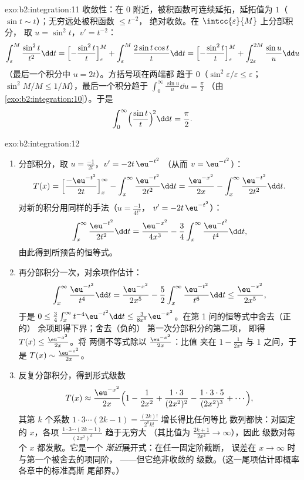 \begin{solution}{exo:b2:integration:11}
收敛性：在 $0$ 附近，被积函数可连续延拓，延拓值为
$1$（$\sin t \sim t$）；无穷远处被积函数 $\leq t^{-2}$，
绝对收敛。在 $\intcc{\varepsilon}{M}$ 上分部积分，
取 $u = \sin^2 t$，$v' = t^{-2}$：
\[
\int_\varepsilon^M \frac{\sin^2 t}{t^2}\dd t
= \Bigl[-\frac{\sin^2 t}{t}\Bigr]_\varepsilon^M
+ \int_\varepsilon^M \frac{2\sin t\cos t}{t}\dd t
= \Bigl[-\frac{\sin^2 t}{t}\Bigr]_\varepsilon^M
+ \int_{2\varepsilon}^{2M} \frac{\sin u}{u}\dd u
\]
（最后一个积分中 $u = 2t$）。方括号项在两端都
趋于 $0$（$\sin^2\varepsilon/\varepsilon \leq \varepsilon$；
$\sin^2 M/M \leq 1/M$），最后一个积分趋于
$\int_0^\infty \frac{\sin u}{u}\dd u = \frac\pi2$
（由\cref{exo:b2:integration:10}）。于是
\[
\int_0^\infty \Bigl(\frac{\sin t}{t}\Bigr)^{\!2}\dd t
= \frac\pi2 .
\]
\end{solution}

\begin{solution}{exo:b2:integration:12}
\begin{enumerate}
  \item 分部积分，取 $u = \frac{-1}{2t}$，$v' = -2t\,\eu^{-t^2}$
        （从而 $v = \eu^{-t^2}$）：
        \[
        T(x) = \Bigl[\frac{-\eu^{-t^2}}{2t}\Bigr]_x^\infty
        - \int_x^\infty \frac{\eu^{-t^2}}{2t^2}\dd t
        = \frac{\eu^{-x^2}}{2x}
        - \int_x^\infty \frac{\eu^{-t^2}}{2t^2}\dd t .
        \]
        对新的积分用同样的手法（$u = \frac{-1}{4t^3}$，
        $v' = -2t\,\eu^{-t^2}$）：
        \[
        \int_x^\infty \frac{\eu^{-t^2}}{2t^2}\dd t
        = \frac{\eu^{-x^2}}{4x^3}
        - \frac34\int_x^\infty \frac{\eu^{-t^2}}{t^4}\dd t ,
        \]
        由此得到所预告的恒等式。
  \item 再分部积分一次，对余项作估计：
        \[
        \int_x^\infty \frac{\eu^{-t^2}}{t^4}\dd t
        = \frac{\eu^{-x^2}}{2x^5}
        - \frac52\int_x^\infty\frac{\eu^{-t^2}}{t^6}\dd t
        \leq \frac{\eu^{-x^2}}{2x^5},
        \]
        于是 $0 \leq \frac34\int_x^\infty t^{-4}\eu^{-t^2}\dd t
        \leq \frac{3}{8x^5}\eu^{-x^2}$。在第 1 问的恒等式中舍去（正的）
        余项即得下界；舍去（负的）
        第一次分部积分的第二项，
        即得 $T(x) \leq \frac{\eu^{-x^2}}{2x}$。将
        两侧不等式除以 $\frac{\eu^{-x^2}}{2x}$：比值
        夹在 $1 - \frac{1}{2x^2}$ 与 $1$ 之间，于是 $T(x)
        \sim \frac{\eu^{-x^2}}{2x}$。
  \item 反复分部积分，得到形式级数
        \[
        T(x) \approx \frac{\eu^{-x^2}}{2x}\Bigl(1 -
        \frac{1}{2x^2} + \frac{1\cdot3}{(2x^2)^2} -
        \frac{1\cdot3\cdot5}{(2x^2)^3} + \cdots\Bigr),
        \]
        其第 $k$ 个系数 $1\cdot3\cdots(2k-1) =
        \frac{(2k)!}{2^k k!}$ 增长得比任何等比
        数列都快：对固定的 $x$，各项
        $\frac{1\cdot3\cdots(2k-1)}{(2x^2)^k}$ 趋于无穷大
        （其比值为 $\frac{2k+1}{2x^2} \to \infty$），因此
        级数对每个 $x$ 都发散。它是一个
        \emph{渐近}展开式：在任一固定阶截断，
        误差在 $x \to \infty$ 时与第一个被舍去的项同阶，
        ——但它绝非收敛的
        级数。（这一尾项估计即概率各章中的标准高斯
        尾部界。）
\end{enumerate}
\end{solution}

